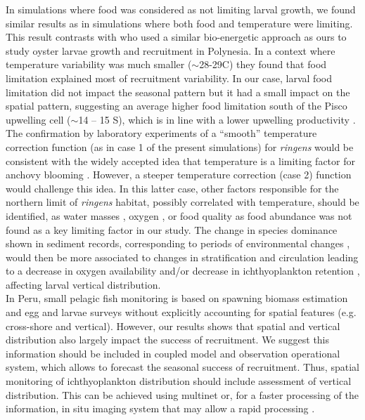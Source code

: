 In simulations where food was considered as not limiting larval growth, we found similar results as in simulations where both food and temperature were limiting. This result contrasts with \cite{ThomDuma2016} who used a similar bio-energetic approach as ours to study oyster larvae growth and recruitment in Polynesia. In a context where temperature variability was much smaller ($\sim$28-29\textdegree C) they found that food limitation explained most of recruitment variability. In our case, larval food limitation did not impact the seasonal pattern but it had a small impact on the spatial pattern, suggesting an average higher food limitation south of the Pisco upwelling cell ($\sim$14 – 15 \textdegree S), which is in line with a lower upwelling productivity \citep{EspiEche2017}.\\

The confirmation by laboratory experiments of a ``smooth” temperature correction function (as in case 1 of the present simulations) for \textit{\gls{ringens}} would be consistent with the widely accepted idea that temperature is a limiting factor for anchovy blooming \citep{ChavBert2008}. However, a steeper temperature correction (case 2) function would challenge this idea. In this latter case, other factors responsible for the northern limit of \textit{\gls{ringens}} habitat, possibly correlated with temperature, should be identified, as water masses \citep{BertSegu2004,SwarBert2008}, oxygen \citep{BertChai2011}, or food quality \citep{AyonSwar2008,CaldAyor2020} as food abundance was not found as a key limiting factor in our study. The change in species dominance shown in sediment records, corresponding to periods of environmental changes \citep{Salv2018,Salv2019}, would then be more associated to changes in stratification and circulation leading to a decrease in oxygen availability and/or decrease in ichthyoplankton retention \citep{BrocEche2013,EspiEche2021}, affecting larval vertical distribution.\\

In Peru, small pelagic fish monitoring is based on spawning biomass estimation and egg and larvae surveys \citep{PaulSori1987,Ayon2000,GutiCast2012} without explicitly accounting for spatial features (e.g. cross-shore and vertical). However, our results shows that spatial and vertical distribution also largely impact the success of recruitment. We suggest this information should be included in coupled model and observation operational system, which allows to forecast the seasonal success of recruitment. Thus, spatial monitoring of ichthyoplankton distribution should include assessment of vertical distribution. This can be achieved using multinet or, for a faster processing of the information, in situ imaging system that may allow a rapid processing \citep{OrenRate2020}.

